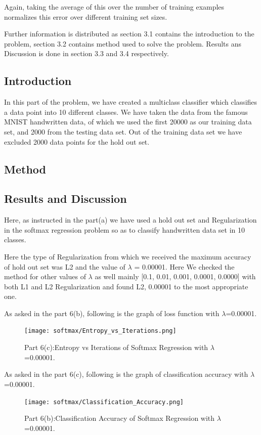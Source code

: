 \documentclass{article} %
\begin{document}
Again, taking the average of this over the number of training examples normalizes this error over different training set sizes.

Further information is distributed as section 3.1 contains the introduction to the problem, section 3.2 contains method used to solve the problem. Results ans Discussion is done in section 3.3 and 3.4 respectively.\\ 
\subsection{Introduction}
In this part of the problem, we have created a multiclass classifier which classifies a data point into 10 different classes. We have taken the data from the famous MNIST handwritten data, of which we used the first 20000 as our training data set, and 2000 from the testing data set. Out of the training data set we have excluded 2000 data points for the hold out set.\\

\subsection{Method}
\subsection{Results and Discussion}

Here, as instructed in the part(a) we have used a hold out set and Regularization in the softmax regression problem so as to classify handwritten data set in 10 classes.

Here the type of Regularization from which we received the maximum accuracy of hold out set was L2 and the value of $\lambda$ = 0.00001. Here We checked the method for other values of $\lambda$ as well mainly [0.1, 0.01, 0.001, 0.0001, 0.0000] with both L1 and L2 Regularization and found L2, 0.00001 to the most appropriate one.

As asked in the part 6(b), following is the graph of loss function with $\lambda$=0.00001.
\begin{figure}[H]
\begin{center}
\texttt{[image: softmax/Entropy\_vs\_Iterations.png]}
\end{center}
\caption{Part 6(c):Entropy vs Iterations of Softmax Regression with $\lambda$=0.00001.}
\end{figure}

As asked in the part 6(c), following is the graph of classification accuracy with $\lambda$=0.00001.

\begin{figure}[H]
\begin{center}
\texttt{[image: softmax/Classification\_Accuracy.png]}
\end{center}
\caption{Part 6(b):Classification Accuracy of Softmax Regression with $\lambda$=0.00001.}
\end{figure}
\end{document}
